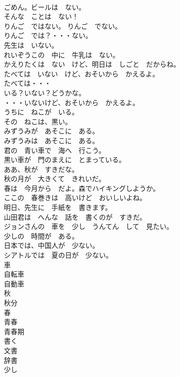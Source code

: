 \documentclass[8pt]{extreport}
\begin{document}
\begin{CJK}{UTF8}{min}
\\	ごめん。ビールは　ない。	
\\	そんな　ことは　ない！	
\\	りんご　ではない。 りんご　でない。	
\\	りんご　では？・・・ない。	
\\	先生は　いない。	
\\	れいぞうこの　中に　牛乳は　ない。	
\\	かえりたくは　ない　けど、明日は　しごと　だからね。	
\\	たべては　いない　けど、おそいから　かえるよ。	
\\	たべては・・・	
\\	いる？いない？どうかな。	
\\	・・・いないけど、おそいから　かえるよ。	
\\	うちに　ねこが　いる。	
\\	その　ねこは、黒い。	
\\	みずうみが　あそこに　ある。	
\\	みずうみは　あそこに　ある。	
\\	君の　青い車で　海へ　行こう。	
\\	黒い車が　門のまえに　とまっている。	
\\	ああ、秋が　すきだな。	
\\	秋の月が　大きくて　きれいだ。	
\\	春は　今月から　だよ。森でハイキングしようか。	
\\	ここの　春巻きは　高いけど　おいしいよね。	
\\	明日、先生に　手紙を　書きます。	
\\	山田君は　へんな　話を　書くのが　すきだ。	
\\	ジョンさんの　車を　少し　うんてん　して　見たい。	
\\	少しの　時間が　ある。	
\\	日本では、中国人が　少ない。	
\\	シアトルでは　夏の日が　少ない。	
\\	車	
\\	自転車	
\\	自動車	
\\	秋	
\\	秋分	
\\	春	
\\	青春	
\\	青春期	
\\	書く	
\\	文書	
\\	辞書	
\\	少し	

\end{CJK}
\end{document}
